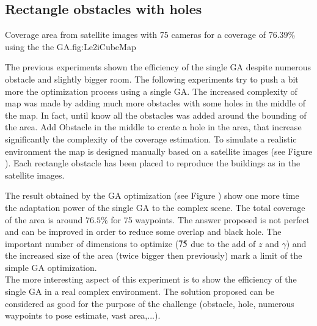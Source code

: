 	\subsection{Rectangle obstacles with holes}\label{sec:RecObstacleHole}

\begin{mfigures}[!]
{Coverage area from satellite images with 75 cameras for a coverage of $76.39\%$ using the the GA.}{fig:Le2iCubeMap} \centering
{}
\hspace{1cm}
\hspace{1cm}
\tabsimuposeIUTcube
\end{mfigures}	

The previous experiments shown the efficiency of the single GA despite numerous obstacle and slightly bigger room. The following experiments try to push a bit more the optimization process using a single GA. The increased complexity of map was made by adding much more obstacles with some holes in the middle of the map. In fact, until know all the obstacles was added around the bounding of the area. Add Obstacle in the middle to create a hole in the area, that increase significantly the complexity of the coverage estimation.
To simulate a realistic environment the map is designed manually based on a satellite images (see Figure ). Each rectangle obstacle has been placed to reproduce the buildings as in  the satellite images. 

The result obtained by the GA optimization (see Figure ) show one more time the adaptation power of the single GA to the complex scene. The total coverage of the area is around $76.5\%$ for 75 waypoints. The answer proposed is not perfect and can be improved in order to reduce some overlap and black hole. The important number of dimensions to optimize ($75\time 4$ due to the add of $z$ and  $\gamma$) and the increased size of the area (twice bigger then previously) mark a limit of the simple GA optimization.\\
	The more interesting aspect of this experiment is to show the efficiency of the single GA in a real complex environment. The solution proposed can be considered as good for the purpose of the challenge (obstacle, hole, numerous waypoints to pose estimate, vast area,...). 
  
